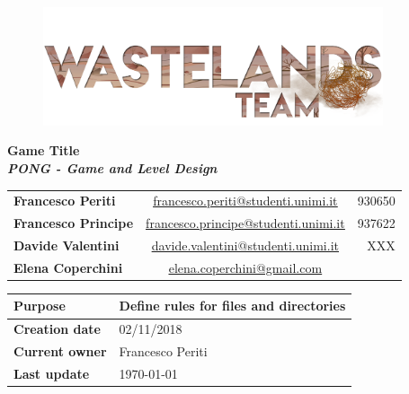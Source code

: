 \documentclass[12pt]{article}
\begin{document}
\begin{center}
  \begin{figure}[H]
  \centering
  \vspace*{5\baselineskip}
  \includegraphics[width=10cm]{Documents/Images/logoTeam}
  \end{figure}

  \vspace{50pt}
  {\huge \textbf{Game Title}} \\
  {\large \textbf{ \textit{PONG - Game and Level Design}}}
\end{center}

\vspace{20pt}
\begin{table}[H]
  \centering
  \begin{tabular}{lcr}
    \textbf{Francesco Periti}	& \underline{\href{mailto:francesco.periti@studenti.unimi.it}{francesco.periti@studenti.unimi.it}}	& 930650 \\
    \textbf{Francesco Principe}	& \underline{\href{mailto:francesco.principe@studenti.unimi.it}{francesco.principe@studenti.unimi.it}}	& 937622 \\
    \textbf{Davide Valentini}	& \underline{\href{mailto:davide.valentini@studenti.unimi.it}{davide.valentini@studenti.unimi.it}}	& XXX \\
    \textbf{Elena Coperchini}	& \underline{\href{mailto:elena.coperchini@gmail.com}{elena.coperchini@gmail.com}}			& \\
  \end{tabular}
\end{table}


  \vspace{10pt}
\begin{table}[H]
  \centering
  \begin{tabular}{|l|l|}
    \hline
    \cellcolor{lightgray}\textbf{Purpose} &  Define rules for files and directories \\\hline
    \cellcolor{lightgray}\textbf{Creation date} & 02/11/2018 \\\hline
    \cellcolor{lightgray}\textbf{Current owner} & Francesco Periti \\\hline
    \cellcolor{lightgray}\textbf{Last update} & \today \\\hline
  \end{tabular}
\end{table}
\end{document}
